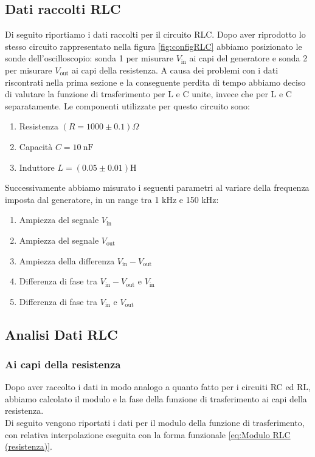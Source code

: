 \documentclass[letterpaper,12pt]{article}
\begin{document}
\subsection{Dati raccolti RLC} 
Di seguito riportiamo i dati raccolti per il circuito RLC. Dopo aver riprodotto lo stesso circuito rappresentato nella figura \ref{fig:configRLC} abbiamo posizionato le sonde dell'oscilloscopio: sonda 1 per misurare $V_\text{in}$ ai capi del generatore e sonda 2 per misurare $V_\text{out}$ ai capi della resistenza. A causa dei problemi con i dati riscontrati nella prima sezione e la conseguente perdita di tempo abbiamo deciso di valutare la funzione di trasferimento per L e C unite, invece che per L e C separatamente. Le componenti utilizzate per questo circuito sono:
\begin{enumerate}
	\item Resistenza $(R = 1000\pm0.1) \Omega$
        \item Capacità $C = 10\ \text{nF} $
	\item Induttore $L = (0.05\pm0.01) \text{H}$
\end{enumerate}
Successivamente abbiamo misurato i seguenti parametri al variare della frequenza imposta dal generatore, in un range tra 1 kHz e 150 kHz:
\begin{enumerate}
	\item Ampiezza del segnale $V_\text{in}$
	\item Ampiezza del segnale $V_\text{out}$
	\item Ampiezza della differenza $V_\text{in} - V_\text{out}$
	\item Differenza di fase tra $V_\text{in} - V_\text{out}$ e $V_\text{in}$
	\item Differenza di fase tra $V_\text{in}$ e $V_\text{out}$
\end{enumerate}

\subsection{Analisi Dati RLC}

\subsubsection{Ai capi della resistenza}
Dopo aver raccolto i dati in modo analogo a quanto fatto per i circuiti RC ed RL, abbiamo calcolato il modulo e la fase della funzione di trasferimento ai capi della resistenza.\\
Di seguito vengono riportati i dati per il modulo della funzione di trasferimento, con relativa interpolazione eseguita con la forma funzionale \ref{eq:Modulo RLC (resistenza)}.  
\end{document}

